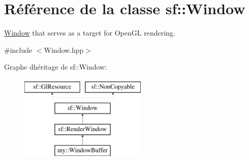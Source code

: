 \hypertarget{classsf_1_1Window}{}\section{Référence de la classe sf\+:\+:Window}
\label{classsf_1_1Window}


\hyperlink{classsf_1_1Window}{Window} that serves as a target for Open\+GL rendering.  




{\ttfamily \#include $<$Window.\+hpp$>$}

Graphe d\textquotesingle{}héritage de sf\+:\+:Window\+:\begin{figure}[H]
\begin{center}
\leavevmode
\includegraphics[height=4.000000cm]{classsf_1_1Window}
\end{center}
\end{figure}
